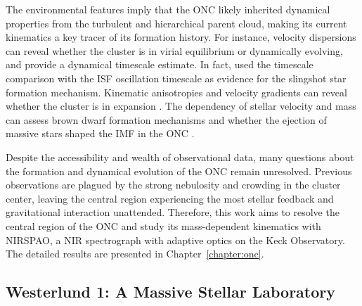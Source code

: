 \documentclass[12pt]{ucsddissertation}
\begin{document}
\begin{CJK*}{UTF8}{gbsn}
The environmental features imply that the ONC likely inherited dynamical properties from the turbulent and hierarchical parent cloud, making its current kinematics a key tracer of its formation history. For instance, velocity dispersions can reveal whether the cluster is in virial equilibrium or dynamically evolving, and provide a dynamical timescale estimate. In fact, \citet{Stutz-2018} used the timescale comparison with the ISF oscillation timescale as evidence for the slingshot star formation mechanism. Kinematic anisotropies and velocity gradients can reveal whether the cluster is in expansion \citep[][]{Swiggum-2021}. The dependency of stellar velocity and mass can assess brown dwarf formation mechanisms \citep[][]{Bonnell-2008} and whether the ejection of massive stars shaped the IMF in the ONC \citep[][]{Poveda-2005, Kroupa-2018}.

Despite the accessibility and wealth of observational data, many questions about the formation and dynamical evolution of the ONC remain unresolved. Previous observations are plagued by the strong nebulosity and crowding in the cluster center, leaving the central region experiencing the most stellar feedback and gravitational interaction unattended. Therefore, this work aims to resolve the central region of the ONC and study its mass-dependent kinematics with NIRSPAO, a NIR spectrograph with adaptive optics on the Keck Observatory. The detailed results are presented in Chapter~\ref{chapter:onc}.




%
%
\subsection*{Westerlund 1: A Massive Stellar Laboratory}%


\end{CJK*}
\end{document}
